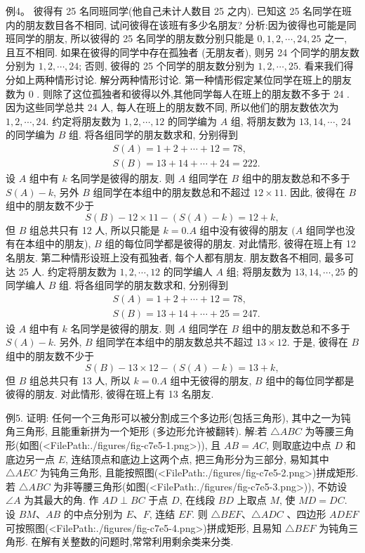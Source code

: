 例4。 彼得有 25 名同班同学(他自己未计人数目 25 之内). 已知这 25 名同学在班内的朋友数目各不相同, 试问彼得在该班有多少名朋友?
分析:因为彼得也可能是同班同学的朋友, 所以彼得的 25 名同学的朋友数分别只能是 $0,1,2, \cdots, 24,25$ 之一, 且互不相同.
如果在彼得的同学中存在孤独者 (无朋友者), 则另 24 个同学的朋友数分别为 $1,2, \cdots, 24$; 否则, 彼得的 25 个同学的朋友数分别为 $1,2, \cdots, 25$. 看来我们得分如上两种情形讨论.
解分两种情形讨论.
第一种情形假定某位同学在班上的朋友数为 0 . 则除了这位孤独者和彼得以外,其他同学每人在班上的朋友数不多于 24 . 因为这些同学总共 24 人, 每人在班上的朋友数不同, 所以他们的朋友数依次为 $1,2, \cdots, 24$.
约定将朋友数为 $1,2, \cdots, 12$ 的同学编为 $A$ 组, 将朋友数为 $13,14, \cdots$, 24 的同学编为 $B$ 组.
将各组同学的朋友数求和, 分别得到
$$
\begin{aligned}
& S(A)=1+2+\cdots+12=78, \\
& S(B)=13+14+\cdots+24=222 .
\end{aligned}
$$
设 $A$ 组中有 $k$ 名同学是彼得的朋友.
则 $A$ 组同学在 $B$ 组中的朋友数总和不多于 $S(A)-k$, 另外 $B$ 组同学在本组中的朋友数总和不超过 $12 \times 11$. 因此, 彼得在 $B$ 组中的朋友数不少于
$$
S(B)-12 \times 11-(S(A)-k)=12+k,
$$
但 $B$ 组总共只有 12 人, 所以只能是 $k=0 . A$ 组中没有彼得的朋友 $(A$ 组同学也没有在本组中的朋友), $B$ 组的每位同学都是彼得的朋友.
对此情形, 彼得在班上有 12 名朋友.
第二种情形设班上没有孤独者, 每个人都有朋友.
朋友数各不相同, 最多可达 25 人.
约定将朋友数为 $1,2, \cdots, 12$ 的同学编人 $A$ 组; 将朋友数为 $13,14, \cdots, 25$ 的同学编人 $B$ 组.
将各组同学的朋友数求和, 分别得到
$$
\begin{aligned}
& S(A)=1+2+\cdots+12=78, \\
& S(B)=13+14+\cdots+25=247 .
\end{aligned}
$$
设 $A$ 组中有 $k$ 名同学是彼得的朋友.
则 $A$ 组同学在 $B$ 组中的朋友数总和不多于 $S(A)-k$. 另外, $B$ 组同学在本组中的朋友数总共不超过 $13 \times 12$. 于是, 彼得在 $B$ 组中的朋友数不少于
$$
S(B)-13 \times 12-(S(A)-k)=13+k,
$$
但 $B$ 组总共只有 13 人, 所以 $k=0 . A$ 组中无彼得的朋友, $B$ 组中的每位同学都是彼得的朋友.
对此情形, 彼得在班上有 13 名朋友.



例5. 证明: 任何一个三角形可以被分割成三个多边形(包括三角形), 其中之一为钝角三角形, 且能重新拼为一个矩形 (多边形允许被翻转).
解:若 $\triangle A B C$ 为等腰三角形(如图(<FilePath:./figures/fig-c7e5-1.png>)), 且 $A B=A C$, 则取底边中点 $D$ 和底边另一点 $E$, 连结顶点和底边上这两个点, 把三角形分为三部分, 易知其中 $\triangle A E C$ 为钝角三角形, 且能按照图(<FilePath:./figures/fig-c7e5-2.png>)拼成矩形.
若 $\triangle A B C$ 为非等腰三角形(如图(<FilePath:./figures/fig-c7e5-3.png>)), 不妨设 $\angle A$ 为其最大的角.
作 $A D \perp B C$ 于点 $D$, 在线段 $B D$ 上取点 $M$, 使 $M D=D C$. 设 $B M 、 A B$ 的中点分别为 $E 、 F$, 连结 $E F$. 则 $\triangle B E F 、 \triangle A D C$ 、四边形 $A D E F$ 可按照图(<FilePath:./figures/fig-c7e5-4.png>)拼成矩形, 且易知 $\triangle B E F$ 为钝角三角形.
在解有关整数的问题时,常常利用剩余类来分类.



